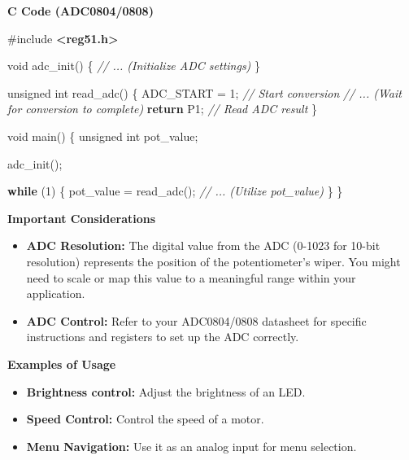 \documentclass[
]{article}
\newenvironment{Shaded}{}{}
\newcommand{\CommentTok}[1]{\textcolor[rgb]{0.38,0.63,0.69}{\textit{#1}}}
\newcommand{\ControlFlowTok}[1]{\textcolor[rgb]{0.00,0.44,0.13}{\textbf{#1}}}
\newcommand{\DataTypeTok}[1]{\textcolor[rgb]{0.56,0.13,0.00}{#1}}
\newcommand{\DecValTok}[1]{\textcolor[rgb]{0.25,0.63,0.44}{#1}}
\newcommand{\ImportTok}[1]{\textcolor[rgb]{0.00,0.50,0.00}{\textbf{#1}}}
\newcommand{\NormalTok}[1]{#1}
\newcommand{\OperatorTok}[1]{\textcolor[rgb]{0.40,0.40,0.40}{#1}}
\newcommand{\PreprocessorTok}[1]{\textcolor[rgb]{0.74,0.48,0.00}{#1}}
\begin{document}
\textbf{C Code (ADC0804/0808)}

\begin{Shaded}
\begin{Highlighting}[]
\PreprocessorTok{\#include }\ImportTok{\textless{}reg51.h\textgreater{}}

\DataTypeTok{void}\NormalTok{ adc\_init}\OperatorTok{()} \OperatorTok{\{}
   \CommentTok{// ... (Initialize ADC settings)}
\OperatorTok{\}}

\DataTypeTok{unsigned} \DataTypeTok{int}\NormalTok{ read\_adc}\OperatorTok{()} \OperatorTok{\{}
\NormalTok{    ADC\_START }\OperatorTok{=} \DecValTok{1}\OperatorTok{;}  \CommentTok{// Start conversion}
    \CommentTok{// ... (Wait for conversion to complete)}
    \ControlFlowTok{return}\NormalTok{ P1}\OperatorTok{;}      \CommentTok{// Read ADC result}
\OperatorTok{\}}

\DataTypeTok{void}\NormalTok{ main}\OperatorTok{()} \OperatorTok{\{}
    \DataTypeTok{unsigned} \DataTypeTok{int}\NormalTok{ pot\_value}\OperatorTok{;}

\NormalTok{    adc\_init}\OperatorTok{();}

    \ControlFlowTok{while} \OperatorTok{(}\DecValTok{1}\OperatorTok{)} \OperatorTok{\{}
\NormalTok{        pot\_value }\OperatorTok{=}\NormalTok{ read\_adc}\OperatorTok{();}
        \CommentTok{// ... (Utilize pot\_value)}
    \OperatorTok{\}}
\OperatorTok{\}}
\end{Highlighting}
\end{Shaded}

\textbf{Important Considerations}

\begin{itemize}
\item
  \textbf{ADC Resolution:} The digital value from the ADC (0-1023 for
  10-bit resolution) represents the position of the potentiometer's
  wiper. You might need to scale or map this value to a meaningful range
  within your application.
\item
  \textbf{ADC Control:} Refer to your ADC0804/0808 datasheet for
  specific instructions and registers to set up the ADC correctly.
\end{itemize}

\textbf{Examples of Usage}

\begin{itemize}
\item
  \textbf{Brightness control:} Adjust the brightness of an LED.
\item
  \textbf{Speed Control:} Control the speed of a motor.
\item
  \textbf{Menu Navigation:} Use it as an analog input for menu
  selection.
\end{itemize}
\end{document}
